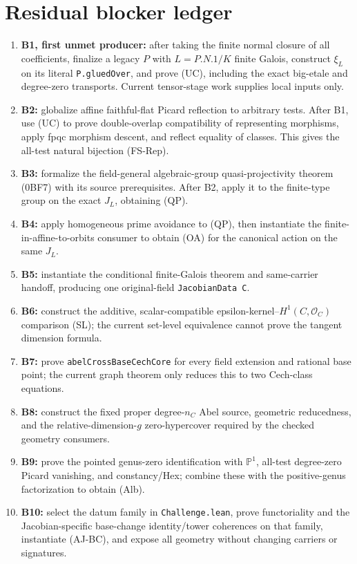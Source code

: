 \section{Residual blocker ledger}

\begin{remark}
  \label{route-app-blockers}

  \begin{enumerate}
  \item \textbf{B1, first unmet producer:} after taking the finite normal
    closure of all coefficients, finalize a legacy \(P\) with
    \(L=P.N.1/K\) finite Galois, construct \(\xi_L\) on its literal
    \texttt{P.gluedOver}, and prove (UC), including the exact big-etale and
    degree-zero transports.  Current tensor-stage work supplies local inputs
    only.
  \item \textbf{B2:} globalize affine faithful-flat Picard reflection to
    arbitrary tests.  After B1, use (UC) to prove double-overlap compatibility
    of representing morphisms, apply fpqc morphism descent, and reflect
    equality of classes.  This gives the all-test natural bijection (FS-Rep).
  \item \textbf{B3:} formalize the field-general algebraic-group
    quasi-projectivity theorem (0BF7) with its source prerequisites.
    After B2, apply it to the finite-type group on the exact \(J_L\),
    obtaining (QP).
  \item \textbf{B4:} apply homogeneous prime avoidance to (QP), then
    instantiate the finite-in-affine-to-orbits consumer to obtain (OA)
    for the canonical action on the same \(J_L\).
  \item \textbf{B5:} instantiate the conditional finite-Galois theorem and
    same-carrier handoff, producing one original-field
    \texttt{JacobianData C}.
  \item \textbf{B6:} construct the additive, scalar-compatible
    epsilon-kernel--\(H^1(C,\mathcal O_C)\) comparison (SL); the current
    set-level equivalence cannot prove the tangent dimension formula.
  \item \textbf{B7:} prove \texttt{abelCrossBaseCechCore} for every field
    extension and rational base point; the current graph theorem only reduces
    this to two Cech-class equations.
  \item \textbf{B8:} construct the fixed proper degree-\(n_C\) Abel source,
    geometric reducedness, and the relative-dimension-\(g\) zero-hypercover
    required by the checked geometry consumers.
  \item \textbf{B9:} prove the pointed genus-zero identification with
    \(\mathbb P^1\), all-test degree-zero Picard vanishing, and constancy/Hex;
    combine these with the positive-genus factorization to obtain (Alb).
  \item \textbf{B10:} select the datum family in \texttt{Challenge.lean}, prove
    functoriality and the Jacobian-specific base-change identity/tower
    coherences on that family, instantiate (AJ-BC), and expose all geometry
    without changing carriers or signatures.
  \end{enumerate}


\end{remark}
